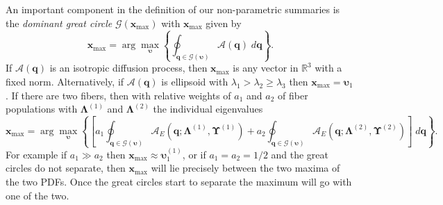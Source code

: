 \documentclass[dvips,aoas,preprint]{imsart}
\numberwithin{equation}{section}
\theoremstyle{plain}
\newcommand{\q}{\mathbf{q}}
\newcommand{\bu}{\bs{\upsilon}}
\newcommand{\x}{\mathbf{x}}
\newcommand{\cA}{\mathcal{A}}
\newcommand{\cG}{\mathcal{G}}
\newcommand{\bs}[1]{\boldsymbol{#1}}
\begin{document}
An important component in the definition of our non-parametric
summaries is the {\em dominant great circle} $\cG(\x_\text{max})$ with
$\x_\text{max}$ given by
\begin{equation}
  \x_\text{max}=\arg \max_{\bu}\left\{ \oint_{\q\in\cG(\bu)}
  {\cA}\left(\q\right)\;d\q \right\}.
\end{equation}
If ${\cA}\left(\q\right)$ is an isotropic diffusion process, then
$\x_\text{max}$ is any vector in ${\mathbb{R}}^3$ with a fixed norm.
Alternatively, if ${\cA}\left(\q\right)$ is ellipsoid with
$\lambda_1>\lambda_2\ge \lambda_3$ then $\x_\text{max}=\bu_1$.  If
there are two fibers, then with relative weights of $a_1$ and $a_2$ of
fiber populations with $\bs{\Lambda}^{(1)}$ and $\bs{\Lambda}^{(2)}$
the individual eigenvalues
{\small \begin{equation}
  \x_\text{max} = \arg \max_{\bu}\left\{\left[ a_1
    \oint_{\q\in\cG(\bu)}
    {\cA}_E\left(\q;\bs{\Lambda}^{(1)},\bs{\Upsilon}^{(1)}\right) + a_2
    \oint_{\q\in\cG(\bu)}
    {\cA}_E\left(\q;\bs{\Lambda}^{(2)},\bs{\Upsilon}^{(2)}\right)\right]\;d\q
    \right\}.
\end{equation}}
For example if $a_1\gg{a_2}$ then $\x_\text{max}\approx\bu_1^{(1)}$,
or if $a_1=a_2=1/2$ and the great circles do not separate, then
$\x_\text{max}$ will lie precisely between the two maxima of the two
PDFs.  Once the great circles start to separate the maximum will go
with one of the two.
\end{document}
